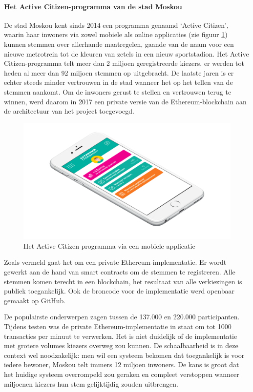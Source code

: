 				\paragraph{Het Active Citizen-programma van de stad Moskou}
				De stad Moskou kent sinds 2014 een programma genaamd `Active Citizen', waarin haar inwoners via zowel mobiele als online applicaties (zie figuur \ref{fig:active_citizen}) kunnen stemmen over allerhande maatregelen, gaande van de naam voor een nieuwe metrotrein tot de kleuren van zetels in een nieuw sportstadion. Het Active Citizen-programma telt meer dan 2 miljoen geregistreerde kiezers, er werden tot heden al meer dan 92 miljoen stemmen op uitgebracht. De laatste jaren is er echter steeds minder vertrouwen in de stad wanneer het op het tellen van de stemmen aankomt. Om de inwoners gerust te stellen en vertrouwen terug te winnen, werd daarom in 2017 een private versie van de Ethereum-blockchain aan de architectuur van het project toegevoegd. ~\autocite{Kshetri2018}
				
				\begin{figure}
					\includegraphics[width=\linewidth]{img/active_citizen.png}
					\caption{Het Active Citizen programma via een mobiele applicatie}
					\label{fig:active_citizen}
				\end{figure}
				
				Zoals vermeld gaat het om een private Ethereum-implementatie. Er wordt gewerkt aan de hand van smart contracts om de stemmen te registreren. Alle stemmen komen terecht in een  blockchain, het resultaat van alle verkiezingen is publiek toegankelijk. Ook de broncode voor de implementatie werd openbaar gemaakt op GitHub.
				
				De populairste onderwerpen zagen tussen de 137.000 en 220.000 participanten. Tijdens testen was de private Ethereum-implementatie in staat om tot 1000 transacties per minuut te verwerken. Het is niet duidelijk of de implementatie met  grotere volumes kiezers overweg zou kunnen. De schaalbaarheid is in deze context wel noodzakelijk: men wil een systeem bekomen dat toegankelijk is voor iedere bewoner, Moskou telt immers 12 miljoen inwoners. De kans is groot dat het huidige systeem overrompeld zou geraken en compleet verstoppen wanneer miljoenen kiezers hun stem gelijktijdig zouden uitbrengen.
				
